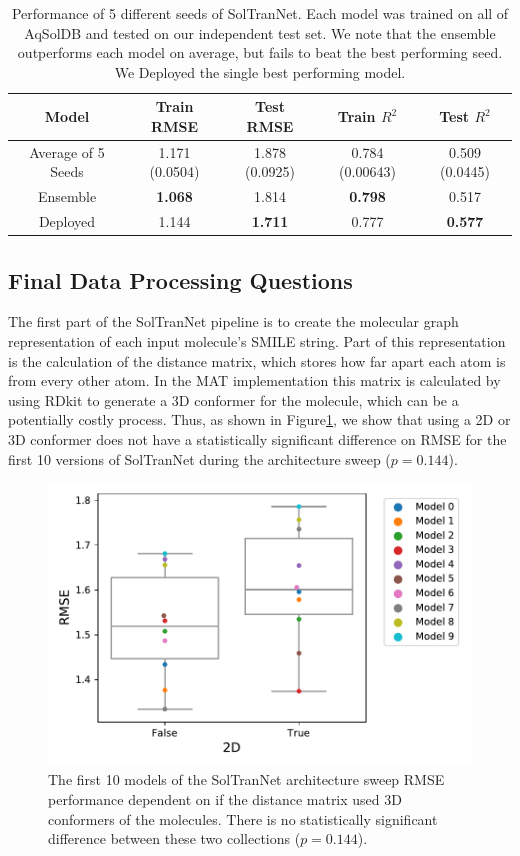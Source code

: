 \documentclass[journal=jmcmar,manuscript=article]{achemso}
\begin{document}
\begin{table}
    \begin{tabular}{|c|c|c|c|c|}
        \hline
        Model & Train RMSE & Test RMSE & Train $R^2$ & Test $R^2$ \\
        \hline
        Average of 5 Seeds & 1.171 (0.0504) & 1.878 (0.0925)  & 0.784 (0.00643) & 0.509 (0.0445)\\
        Ensemble & \textbf{1.068} & 1.814 & \textbf{0.798} & 0.517\\
        Deployed & 1.144 & \textbf{1.711} & 0.777 & \textbf{0.577}\\
        \hline
    \end{tabular}
    \caption{Performance of 5 different seeds of SolTranNet. Each model was trained on all of AqSolDB and tested on our independent test set. We note that the ensemble outperforms each model on average, but fails to beat the best performing seed. We Deployed the single best performing model.}
    \label{tab:deployed}
\end{table}

\subsection{Final Data Processing Questions}

The first part of the SolTranNet pipeline is to create the molecular graph representation of each input molecule's SMILE string.
Part of this representation is the calculation of the distance matrix, which stores how far apart each atom is from every other atom.
In the MAT implementation this matrix is calculated by using RDkit to generate a 3D conformer for the molecule, which can be a potentially costly process.
Thus, as shown in Figure\ref{fig:2dv3drmse}, we show that using a 2D or 3D conformer does not have a statistically significant difference on RMSE for the first 10 versions of SolTranNet during the architecture sweep ($p=0.144$).

\begin{figure}[tb]
    \centering
    \includegraphics[width=\linewidth]{figures/2dv3d_rmse.pdf}
    \caption{The first 10 models of the SolTranNet architecture sweep RMSE performance dependent on if the distance matrix used 3D conformers of the molecules. There is no statistically significant difference between these two collections ($p=0.144$).}
    \label{fig:2dv3drmse}
\end{figure}
\end{document}
